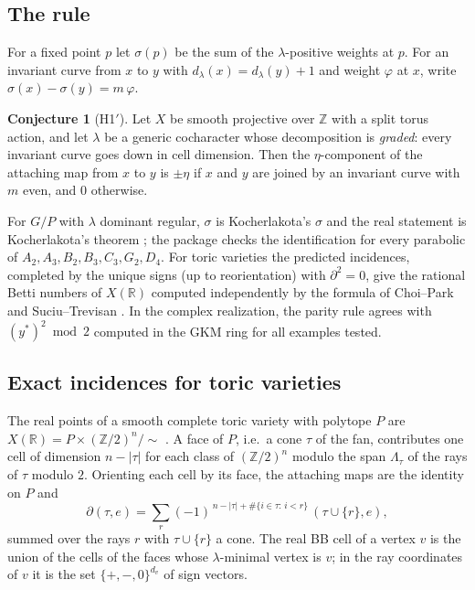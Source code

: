 \documentclass[11pt]{amsart}
\theoremstyle{definition}
\newtheorem{conjecture}[theorem]{Conjecture}
\theoremstyle{remark}
\newcommand{\ZZ}{\mathbb{Z}}
\newcommand{\RR}{\mathbb{R}}
\begin{document}
\subsection{The rule}
For a fixed point $p$ let $\sigma(p)$ be the sum of the $\lambda$-positive
weights at $p$. For an invariant curve from $x$ to $y$ with
$d_\lambda(x)=d_\lambda(y)+1$ and weight $\varphi$ at $x$, write
$\sigma(x)-\sigma(y)=m\,\varphi$.

\begin{conjecture}[H1${}'$]\label{conj:h1}
Let $X$ be smooth projective over $\ZZ$ with a split torus action, and let
$\lambda$ be a generic cocharacter whose decomposition is \emph{graded}:
every invariant curve goes down in cell dimension. Then the
$\eta$-component of the attaching map from $x$ to $y$ is $\pm\eta$ if $x$
and $y$ are joined by an invariant curve with $m$ even, and $0$ otherwise.
\end{conjecture}

For $G/P$ with $\lambda$ dominant regular, $\sigma$ is Kocherlakota's
$\sigma$ and the real statement is Kocherlakota's theorem \cite{Kocherlakota};
the package checks the identification for every parabolic of
$A_2,A_3,B_2,B_3,C_3,G_2,D_4$. For toric varieties the predicted
incidences, completed by the unique signs (up to reorientation) with
$\partial^2=0$, give the rational Betti numbers of $X(\RR)$ computed
independently by the formula of Choi--Park and Suciu--Trevisan
\cite{ChoiPark,SuciuTrevisan,SuciuOWR}. In the complex realization, the parity rule
agrees with $(y^*)^2\bmod2$ computed in the GKM ring for all examples tested.

\subsection{Exact incidences for toric varieties}
The real points of a smooth complete toric variety with polytope $P$ are
$X(\RR)=P\times(\ZZ/2)^n/\!\sim$ \cite{DavisJanuszkiewicz}. A face of $P$,
i.e.\ a cone $\tau$ of the fan, contributes one cell of dimension
$n-|\tau|$ for each class of $(\ZZ/2)^n$ modulo the span $\Lambda_\tau$ of
the rays of $\tau$ modulo $2$. Orienting each cell by its face, the
attaching maps are the identity on $P$ and
\[
\partial(\tau,e)=\sum_{r}(-1)^{\,n-|\tau|+\#\{i\in\tau:\,i<r\}}\,(\tau\cup\{r\},e),
\]
summed over the rays $r$ with $\tau\cup\{r\}$ a cone. The real BB cell of a
vertex $v$ is the union of the cells of the faces whose $\lambda$-minimal
vertex is $v$; in the ray coordinates of $v$ it is the set $\{+,-,0\}^{d_v}$
of sign vectors.
\end{document}
